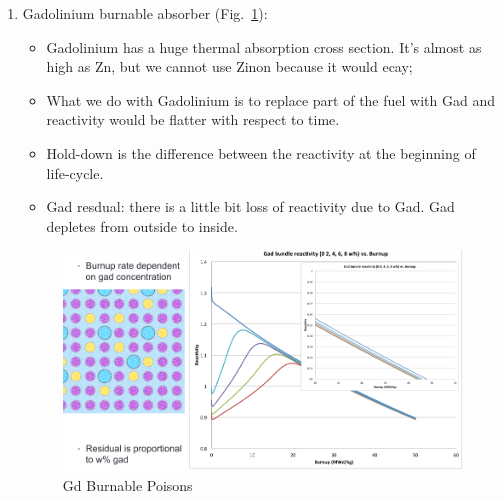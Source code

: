 \documentclass{school-22.211-notes}
\begin{document}
\begin{enumerate}
\item Gadolinium burnable absorber (Fig.~\ref{Gd-BP}): 
  \begin{itemize}
  \item Gadolinium has a huge thermal absorption cross section. It's almost as high as Zn, but we cannot use Zinon because it would ecay; 
  \item What we do with Gadolinium is to replace part of the fuel with Gad and reactivity would be flatter with respect to time. 
  \item Hold-down is the difference between the reactivity at the beginning of life-cycle. 
  \item Gad resdual: there is a little bit loss of reactivity due to Gad. Gad depletes from outside to inside. 
  \end{itemize}
  \begin{figure}
    \centering
    \includegraphics[width=5in]{images/dfs/Gd-BP.png}
    \caption{Gd Burnable Poisons}  \label{Gd-BP}
  \end{figure}
\end{enumerate}
\end{document}
